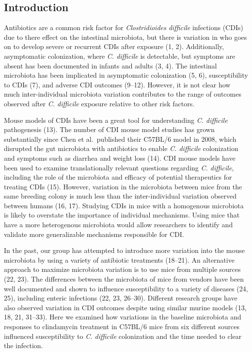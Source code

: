 \documentclass[
  11pt,
]{article}
\begin{document}
\newpage

\hypertarget{introduction}{%
\subsection{Introduction}\label{introduction}}

Antibiotics are a common risk factor for \emph{Clostridioides difficile}
infections (CDIs) due to there effect on the intestinal microbiota, but
there is variation in who goes on to develop severe or recurrent CDIs
after exposure (1, 2). Additionally, asymptomatic colonization, where
\emph{C. difficile} is detectable, but symptoms are absent has been
documented in infants and adults (3, 4). The intestinal microbiota has
been implicated in asymptomatic colonization (5, 6), susceptibility to
CDIs (7), and adverse CDI outcomes (9--12). However, it is not clear how
much inter-individual microbiota variation contributes to the range of
outcomes observed after \emph{C. difficile} exposure relative to other
risk factors.

Mouse models of CDIs have been a great tool for understanding \emph{C.
difficile} pathogenesis (13). The number of CDI mouse model studies has
grown substantially since Chen et al.~published their C57BL/6 model in
2008, which disrupted the gut microbiota with antibiotics to enable
\emph{C. difficile} colonization and symptoms such as diarrhea and
weight loss (14). CDI mouse models have been used to examine
translationally relevant questions regarding \emph{C. difficile},
including the role of the microbiota and efficacy of potential
therapeutics for treating CDIs (15). However, variation in the
microbiota between mice from the same breeding colony is much less than
the inter-individual variation observed between humans (16, 17).
Studying CDIs in mice with a homogenous microbiota is likely to
overstate the importance of individual mechanisms. Using mice that have
a more heterogenous microbiota would allow researchers to identify and
validate more generalizable mechanisms responsible for CDI.

In the past, our group has attempted to introduce more variation into
the mouse microbiota by using a variety of antibiotic treatments
(18--21). An alternative approach to maximize microbiota variation is to
use mice from multiple sources (22, 23). The differences between the
microbiota of mice from vendors have been well documented and shown to
influence susceptibility to a variety of diseases (24, 25), including
enteric infections (22, 23, 26--30). Different research groups have also
observed variation in CDI outcomes despite using similar murine models
(13, 18, 21, 31--33). Here we examined how variations in the baseline
microbiota and responses to clindamycin treatment in C57BL/6 mice from
six different sources influenced susceptibility to \emph{C. difficile}
colonization and the time needed to clear the infection.
\end{document}
